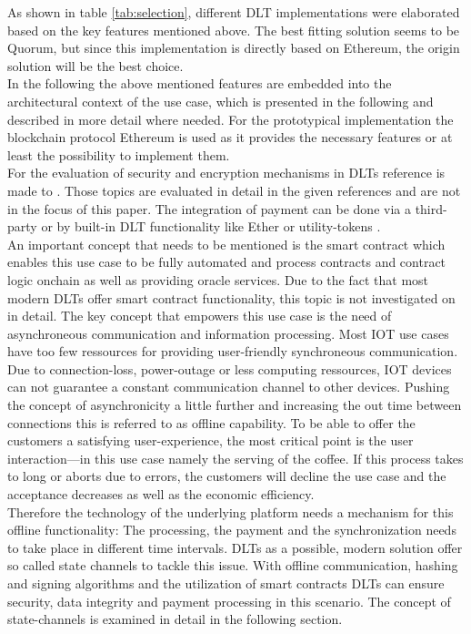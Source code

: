\documentclass[conference]{IEEEtran}
\begin{document}
As shown in table \ref{tab:selection}, different DLT implementations were elaborated based on the key features mentioned above. The best fitting solution seems to be Quorum, but since this implementation is directly based on Ethereum, the origin solution will be the best choice.\\
In the following the above mentioned features are embedded into the architectural context of the use case, which is presented in the following and described in more detail where needed. For the prototypical implementation the blockchain protocol Ethereum \cite{buterin2013} is used as it provides the necessary features or at least the possibility to implement them.\\
For the evaluation of security and encryption mechanisms in DLTs reference is made to \cite{XYZ}. Those topics are evaluated in detail in the given references and are not in the focus of this paper. The integration of payment can be done via a third-party or by built-in DLT functionality like Ether or utility-tokens \cite{XYZ}.\\
An important concept that needs to be mentioned is the smart contract which enables this use case to be fully automated and process contracts and contract logic onchain as well as providing oracle services. Due to the fact that most modern DLTs offer smart contract functionality, this topic is not investigated on in detail. The key concept that empowers this use case is the need of asynchroneous communication and information processing. Most IOT use cases have too few ressources for providing user-friendly synchroneous communication. Due to connection-loss, power-outage or less computing ressources, IOT devices can not guarantee a constant communication channel to other devices. Pushing the concept of asynchronicity a little further and increasing the out time between connections this is referred to as offline capability. To be able to offer the customers a satisfying user-experience, the most critical point is the user interaction---in this use case namely the serving of the coffee. If this process takes to long or aborts due to errors, the customers will decline the use case and the acceptance decreases as well as the economic efficiency.\\
Therefore the technology of the underlying platform needs a mechanism for this offline functionality: The processing, the payment and the synchronization needs to take place in different time intervals. DLTs as a possible, modern solution offer so called state channels to tackle this issue. With offline communication, hashing and signing algorithms and the utilization of smart contracts DLTs can ensure security, data integrity and payment processing in this scenario. The concept of state-channels is examined in detail in the following section.\\
\end{document}
